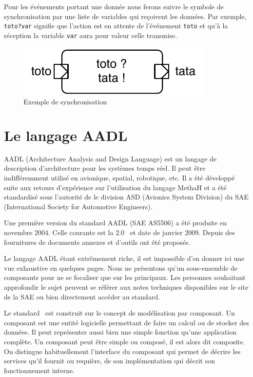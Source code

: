 \documentclass[11pt,a4paper]{paper}
\begin{document}
\begin{appendices}
Pour les événements portant une donnée nous ferons suivre le symbole de synchronisation par une liste de variables qui reçoivent les données. Par exemple, {\tt toto?var} signifie que l'action est en attente de l'événement {\tt toto} et qu'à la réception la variable {\tt var} aura pour valeur celle transmise.

 \begin{figure}[htbp]
\begin{center}
\includegraphics[scale=0.6]{figures_pdf/exem_evt}
\caption{Exemple de synchronisation}
\label{fig:exem_sync}
\end{center}
\end{figure}
\FloatBarrier

\newpage
\section{Le langage AADL} 
\label{ann:aadl}
 
AADL (Architecture Analysis and Design Language) est un langage de description d'architecture pour les systèmes temps réel. Il peut être indifféremment utilisé en avionique, spatial, robotique, etc. Il a été développé suite aux retours d'expérience sur l'utilisation du langage MethaH et a été standardisé sous l'autorité de le division ASD (Avionics System Division) du SAE (International Society for Automotive Engineers).

Une première version du standard AADL (SAE AS5506) a été produite en novembre 2004. Celle courante est la 2.0~\cite{AADL:2009} et date de janvier 2009. Depuis des fournitures de documents annexes et d'outils ont été proposés.

Le langage AADL étant extrêmement riche, il est impossible d'en donner ici une vue exhaustive en quelques pages.  Nous ne présentons qu'un sous-ensemble de composants pour ne se focaliser que sur les principaux. Les personnes souhaitant approfondir le sujet peuvent se référer aux notes techniques disponibles sur le site de la SAE ou bien directement accéder au standard.

Le standard~\cite{AADL:2009} est construit sur le concept de modélisation par composant. Un composant est une entité logicielle permettant de faire un calcul ou de stocker des données. Il peut représenter aussi bien une simple fonction qu'une application complète. Un composant peut être simple ou composé, il est alors dit composite. On distingue habituellement l'interface du composant qui permet de décrire les services qu'il fournit ou requière, de son implémentation qui décrit son fonctionnement interne.


\end{appendices}
\end{document}
